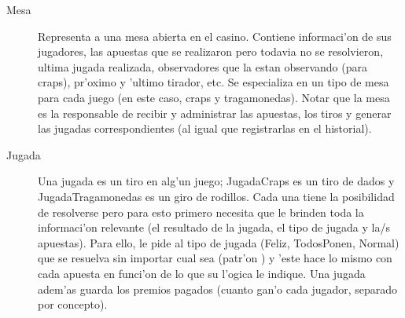 \begin{description}
\item[Mesa] Representa a una mesa abierta en el casino. Contiene informaci'on de sus jugadores, las apuestas que se realizaron pero todavia no se resolvieron, ultima jugada realizada, observadores que la estan observando (para craps), pr'oximo y 'ultimo tirador, etc. Se especializa en un tipo de mesa para cada juego (en este caso, craps y tragamonedas). Notar que la mesa es la responsable de recibir y administrar las apuestas, los tiros y generar las jugadas correspondientes (al igual que registrarlas en el historial).

\item[Jugada] Una jugada es un tiro en alg'un juego; JugadaCraps es un tiro de dados y JugadaTragamonedas es un giro de rodillos. Cada una tiene la posibilidad de resolverse pero para esto primero necesita que le brinden toda la informaci'on relevante (el resultado de la jugada, el tipo de jugada y la/s apuestas). Para ello, le pide al tipo de jugada (Feliz, TodosPonen, Normal) que se resuelva sin importar cual sea (patr'on ) y 'este hace lo mismo con cada apuesta en funci'on de lo que su l'ogica le indique. Una jugada adem'as guarda los premios pagados (cuanto gan'o cada jugador, separado por concepto).


\end{description}
